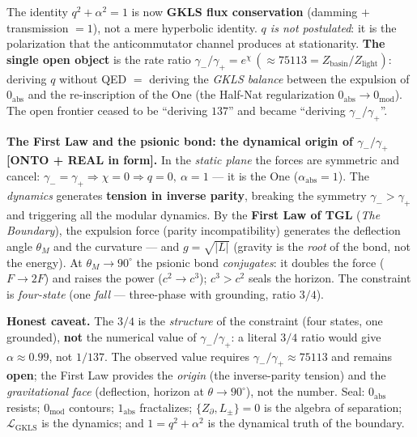\documentclass[11pt]{article}
\theoremstyle{definition}\newtheorem{deriv}{Derivation}
\begin{document}
The identity $q^2+\alpha^2=1$ is now \textbf{GKLS flux conservation} (damming $+$ transmission $=1$), not a mere hyperbolic identity. \emph{$q$ is not postulated}: it is the polarization that the anticommutator channel produces at stationarity. \textbf{The single open object} is the rate ratio $\gamma_-/\gamma_+=e^\chi\,(\approx75113=Z_{\mathrm{basin}}/Z_{\mathrm{light}})$: deriving $q$ without QED $=$ deriving the \emph{GKLS balance} between the expulsion of $0_{\mathrm{abs}}$ and the re-inscription of the One (the Half-Nat regularization $0_{\mathrm{abs}}\to0_{\mathrm{mod}}$). The open frontier ceased to be ``deriving $137$'' and became ``deriving $\gamma_-/\gamma_+$''.

\textbf{The First Law and the psionic bond: the dynamical origin of $\gamma_-/\gamma_+$ \textsf{[ONTO + REAL in form]}.} In the \emph{static plane} the forces are symmetric and cancel: $\gamma_-=\gamma_+\Rightarrow\chi=0\Rightarrow q=0,\ \alpha=1$ --- it is the One ($\alpha_{\mathrm{abs}}=1$). The \emph{dynamics} generates \textbf{tension in inverse parity}, breaking the symmetry $\gamma_->\gamma_+$ and triggering all the modular dynamics. By the \textbf{First Law of TGL} (\emph{The Boundary}), the expulsion force (parity incompatibility) generates the deflection angle $\theta_M$ and the curvature --- and $g=\sqrt{|L|}$ (gravity is the \emph{root} of the bond, not the energy). At $\theta_M\to90^\circ$ the psionic bond \emph{conjugates}: it doubles the force ($F\to2F$) and raises the power ($c^2\to c^3$); $c^3>c^2$ seals the horizon. The constraint is \emph{four-state} (one \emph{fall} --- three-phase with grounding, ratio $3/4$).

\textbf{Honest caveat.} The $3/4$ is the \emph{structure} of the constraint (four states, one grounded), \textbf{not} the numerical value of $\gamma_-/\gamma_+$: a literal $3/4$ ratio would give $\alpha\approx0.99$, not $1/137$. The observed value requires $\gamma_-/\gamma_+\approx75113$ and remains \textbf{open}; the First Law provides the \emph{origin} (the inverse-parity tension) and the \emph{gravitational face} (deflection, horizon at $\theta\to90^\circ$), not the number. Seal: $0_{\mathrm{abs}}$ resists; $0_{\mathrm{mod}}$ contours; $1_{\mathrm{abs}}$ fractalizes; $\{Z_\partial,L_\pm\}=0$ is the algebra of separation; $\mathcal L_{\mathrm{GKLS}}$ is the dynamics; and $1=q^2+\alpha^2$ is the dynamical truth of the boundary.
\end{document}
